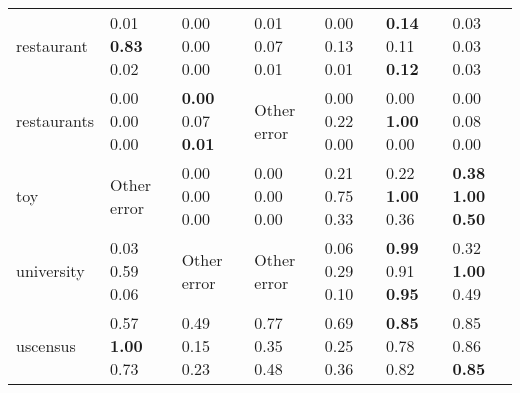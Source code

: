 \begin{table}[h]
\begin{adjustbox}{center}
\begin{tabular}{lllllll}
restaurant  &  0.01  \textbf{0.83} 0.02   &                  0.00  0.00  0.00   &          0.01  0.07  0.01   &  0.00  0.13  0.01   &          \textbf{0.14} 0.11  \textbf{0.12}  &                          0.03  0.03  0.03   \\
restaurants &          0.00  0.00  0.00   &  \textbf{0.00} 0.07  \textbf{0.01}  &                 Other error &  0.00  0.22  0.00   &                  0.00  \textbf{1.00} 0.00   &                          0.00  0.08  0.00   \\
toy         &                 Other error &                  0.00  0.00  0.00   &          0.00  0.00  0.00   &  0.21  0.75  0.33   &                  0.22  \textbf{1.00} 0.36   &  \textbf{0.38} \textbf{1.00} \textbf{0.50}  \\
university  &          0.03  0.59  0.06   &                         Other error &                 Other error &  0.06  0.29  0.10   &          \textbf{0.99} 0.91  \textbf{0.95}  &                  0.32  \textbf{1.00} 0.49   \\
uscensus    &  0.57  \textbf{1.00} 0.73   &                  0.49  0.15  0.23   &          0.77  0.35  0.48   &  0.69  0.25  0.36   &                  \textbf{0.85} 0.78  0.82   &                  0.85  0.86  \textbf{0.85}  \\
\bottomrule
\end{tabular}
\end{adjustbox}
\end{table}



